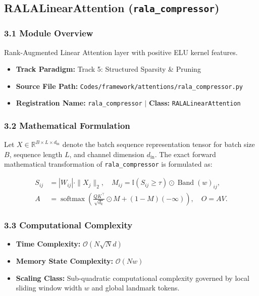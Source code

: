 \subsection{RALALinearAttention (\texttt{rala\_compressor})}
\label{sec:app_module_rala_compressor}

\subsubsection*{3.1 Module Overview}
Rank-Augmented Linear Attention layer with positive ELU kernel features.
\begin{itemize}
    \item \textbf{Track Paradigm:} Track 5: Structured Sparsity \& Pruning
    \item \textbf{Source File Path:} \texttt{Codes/framework/attentions/rala\_compressor.py}
    \item \textbf{Registration Name:} \texttt{rala\_compressor} $\mid$ \textbf{Class:} \texttt{RALALinearAttention}
\end{itemize}

\subsubsection*{3.2 Mathematical Formulation}
Let $X \in \mathbb{R}^{B \times L \times d_{\text{in}}}$ denote the batch sequence representation tensor for batch size $B$, sequence length $L$, and channel dimension $d_{\text{in}}$. The exact forward mathematical transformation of \texttt{rala\_compressor} is formulated as:

\begin{align}
S_{ij} &= |W_{ij}| \cdot \|X_j\|_2, \quad M_{ij} = \mathbb{I}(S_{ij} \ge \tau) \odot \operatorname{Band}(w)_{ij}, \\
A &= \operatorname{softmax}\left(\frac{Q K^\top}{\sqrt{d_k}} \odot M + (1 - M)(-\infty)\right), \quad O = A V.
\end{align}


\subsubsection*{3.3 Computational Complexity}
\begin{itemize}
    \item \textbf{Time Complexity:} $\mathcal{O}(N \sqrt{N} d)$
    \item \textbf{Memory State Complexity:} $\mathcal{O}(N w)$
    \item \textbf{Scaling Class:} Sub-quadratic computational complexity governed by local sliding window width $w$ and global landmark tokens.
\end{itemize}

